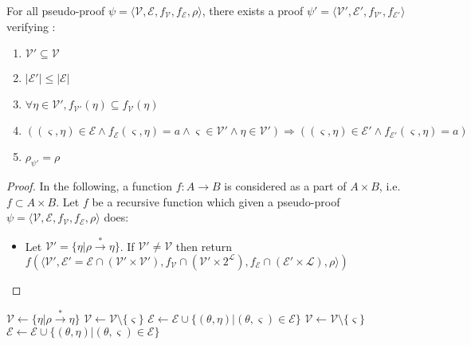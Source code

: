 \documentclass{llncs}
\begin{document}
\begin{proposition}
For all pseudo-proof $\psi = \langle \mathcal{V}, \mathcal{E}, f_\mathcal{V}, f_\mathcal{E}, \rho \rangle$,
there exists a proof $\psi' = \langle \mathcal{V}', \mathcal{E}', f_{\mathcal{V}'},
f_{\mathcal{E}'} \rangle$ verifying :
\begin{enumerate}[nosep]
  \item $\mathcal{V}' \subseteq \mathcal{V}$
  \item $|\mathcal{E}'| \leq |\mathcal{E}|$
  \item $\forall \eta \in \mathcal{V}', f_{\mathcal{V}'}(\eta) \subseteq f_\mathcal{V}(\eta)$
  \item $( (\varsigma,\eta) \in \mathcal{E} \wedge f_\mathcal{E}(\varsigma, \eta) = a \wedge
    \varsigma \in \mathcal{V}' \wedge \eta \in \mathcal{V}' ) \Rightarrow (
    (\varsigma,\eta) \in \mathcal{E}' \wedge f_{\mathcal{E}'}(\varsigma, \eta) = a )$
  \item $\rho_{\psi'} = \rho$
\end{enumerate}
\end{proposition}

\begin{proof}
In the following, a function $f : A \longrightarrow B$ is considered as a part of $A \times B$, i.e.
$f \subset A \times B$.
Let $f$ be a recursive function which given a pseudo-proof $\psi = \langle \mathcal{V},
\mathcal{E}, f_\mathcal{V}, f_\mathcal{E}, \rho \rangle$ does:
\begin{itemize}[nosep]
  \item Let $\mathcal{V}' = \{\eta|\rho \xrightarrow{*} \eta\}$. If $\mathcal{V}' \neq \mathcal{V}$
    then return $f\left(\langle \mathcal{V}', \mathcal{E}' = \mathcal{E} \cap (\mathcal{V}' \times \mathcal{V}'),
    f_\mathcal{V} \cap (\mathcal{V}' \times 2^\mathcal{L}), f_\mathcal{E} \cap (\mathcal{E}' \times \mathcal{L}),
    \rho \rangle\right)$
\end{itemize}
\end{proof}

\begin{algorithm}[hbt]
    { $\mathcal{V} \leftarrow \{\eta|\rho \xrightarrow{*} \eta\}$ \;
    }
  \uElseIf{$\exists \varsigma, \exists ! \eta, \varsigma \rightarrow \eta$}
    { $\mathcal{V} \leftarrow \mathcal{V} \setminus \{\varsigma\}$ \;
      $\mathcal{E} \leftarrow \mathcal{E} \cup \{(\theta,\eta)|(\theta,\varsigma) \in \mathcal{E}\}$ \;
    }
    { $\mathcal{V} \leftarrow \mathcal{V} \setminus \{\varsigma\}$ \;
      $\mathcal{E} \leftarrow \mathcal{E} \cup \{(\theta,\eta)|(\theta,\varsigma) \in \mathcal{E}\}$ \;
    }
\end{algorithm}
\end{document}
